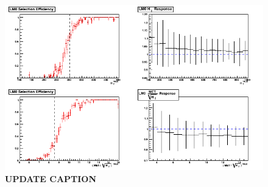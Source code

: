 \begin{figure}[tbh]
\begin{center}
\includegraphics[width=\linewidth]{selectionEffDec10.png}
\caption{\label{fig:leptoniso} 
{\bf UPDATE CAPTION}
}
\end{center}
\end{figure}
